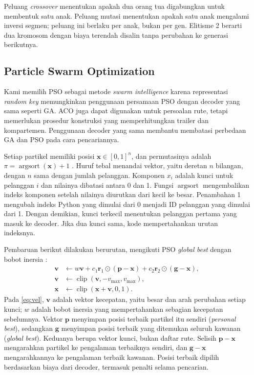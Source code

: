 \documentclass[conference]{IEEEtran}
\begin{document}
Peluang \textit{crossover} menentukan apakah dua orang tua digabungkan untuk membentuk satu anak. Peluang mutasi menentukan apakah satu anak mengalami inversi segmen; peluang ini berlaku per anak, bukan per gen. Elitisme 2 berarti dua kromosom dengan biaya terendah disalin tanpa perubahan ke generasi berikutnya.

\subsection{Particle Swarm Optimization}

Kami memilih PSO sebagai metode \textit{swarm intelligence} karena representasi \textit{random key} memungkinkan penggunaan persamaan PSO dengan decoder yang sama seperti GA. ACO juga dapat digunakan untuk persoalan rute, tetapi memerlukan prosedur konstruksi yang memperhitungkan trailer dan kompartemen. Penggunaan decoder yang sama membantu membatasi perbedaan GA dan PSO pada cara pencariannya.

Setiap partikel memiliki posisi $\mathbf{x}\in[0,1]^n$, dan permutasinya adalah $\pi=\operatorname{argsort}(\mathbf{x})+1$ \cite{bean1994}. Huruf tebal menandai vektor, yaitu deretan $n$ bilangan, dengan $n$ sama dengan jumlah pelanggan. Komponen $x_i$ adalah kunci untuk pelanggan $i$ dan nilainya dibatasi antara 0 dan 1. Fungsi $\operatorname{argsort}$ mengembalikan indeks komponen setelah nilainya diurutkan dari kecil ke besar. Penambahan 1 mengubah indeks Python yang dimulai dari 0 menjadi ID pelanggan yang dimulai dari 1. Dengan demikian, kunci terkecil menentukan pelanggan pertama yang masuk ke decoder. Jika dua kunci sama, kode mempertahankan urutan indeksnya.

Pembaruan berikut dilakukan berurutan, mengikuti PSO \textit{global best} dengan bobot inersia \cite{kennedy1995,shi1998}:
\begin{align}
\mathbf{v} &\leftarrow w\mathbf{v} + c_1\mathbf{r}_1\odot(\mathbf{p}-\mathbf{x}) + c_2\mathbf{r}_2\odot(\mathbf{g}-\mathbf{x}),\label{eq:vel}\\
\mathbf{v} &\leftarrow \operatorname{clip}(\mathbf{v},-v_{\max},v_{\max}),\label{eq:vclip}\\
\mathbf{x} &\leftarrow \operatorname{clip}(\mathbf{x}+\mathbf{v},0,1).\label{eq:pos}
\end{align}
Pada \eqref{eq:vel}, $\mathbf{v}$ adalah vektor kecepatan, yaitu besar dan arah perubahan setiap kunci; $w$ adalah bobot inersia yang mempertahankan sebagian kecepatan sebelumnya. Vektor $\mathbf{p}$ menyimpan posisi terbaik partikel itu sendiri (\textit{personal best}), sedangkan $\mathbf{g}$ menyimpan posisi terbaik yang ditemukan seluruh kawanan (\textit{global best}). Keduanya berupa vektor kunci, bukan daftar rute. Selisih $\mathbf{p}-\mathbf{x}$ mengarahkan partikel ke pengalaman terbaiknya sendiri, dan $\mathbf{g}-\mathbf{x}$ mengarahkannya ke pengalaman terbaik kawanan. Posisi terbaik dipilih berdasarkan biaya dari decoder, termasuk penalti selama pencarian.
\end{document}

